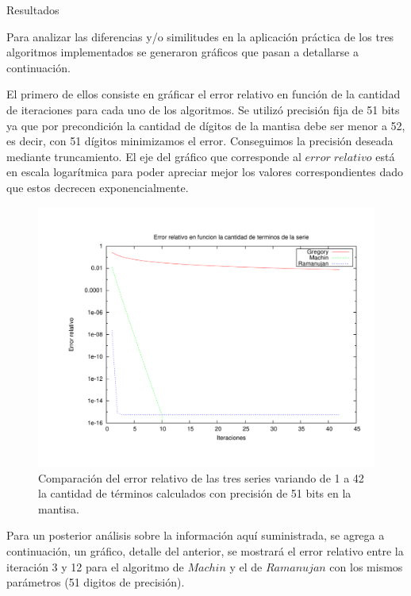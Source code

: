 \begin{section}{Resultados}

	Para analizar las diferencias y/o similitudes en la aplicación práctica de los tres algoritmos implementados se generaron gráficos que pasan a detallarse a continuación. 
		
	El primero de ellos consiste en gráficar el error relativo en función de la cantidad de iteraciones para cada uno de los algoritmos. Se utilizó precisión fija de 51 bits ya que por precondición la cantidad de dígitos de la mantisa debe ser menor a 52, es decir, con 51 dígitos minimizamos el error. Conseguimos la precisión deseada mediante truncamiento.
	El eje del gráfico que corresponde al $error\;relativo$ está en escala logarítmica para poder apreciar mejor los valores correspondientes dado que estos decrecen exponencialmente.

	\begin{figure}[H]
	  \centering
		\includegraphics[width=14cm]{graficos/comparacion_1a42it_51p.pdf}
	  \caption{Comparación del error relativo de las tres series variando de 1 a 42 la cantidad de términos calculados con precisión de 51 bits en la mantisa.}
	  \label{fig:51p}
	\end{figure}

	Para un posterior análisis sobre la información aquí suministrada, se agrega a continuación, un gráfico, detalle del anterior, se mostrará el error relativo entre la iteración 3 y 12 para el algoritmo de $Machin$ y el de $Ramanujan$ con los mismos parámetros (51 digitos de precisión).
	

\end{section}
